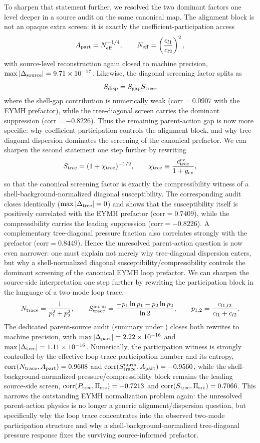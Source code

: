 \documentclass[aps,prd,onecolumn,notitlepage,nofootinbib,superscriptaddress,11pt,floatfix]{revtex4-2}
\begin{document}
To sharpen that statement further, we resolved the two dominant factors one level deeper in a source audit on the same canonical map. The alignment block is not an opaque extra screen: it is exactly the coefficient-participation access
\[
 A_{\rm part}=N_{\rm eff}^{-1/4},
\qquad
N_{\rm eff}=\left(\frac{c_{l1}}{c_{l2}}\right)^2,
\]
with source-level reconstruction again closed to machine precision, $\max|\Delta_{\rm source}|=9.71\times10^{-17}$. Likewise, the diagonal screening factor splits as
\[
S_{\rm disp}=S_{\rm gap}S_{\rm tree},
\]
where the shell-gap contribution is numerically weak ($\mathrm{corr}=0.0907$ with the EYMH prefactor), while the tree-diagonal screen carries the dominant suppression ($\mathrm{corr}=-0.8226$). Thus the remaining parent-action gap is now more specific: why coefficient participation controls the alignment block, and why tree-diagonal dispersion dominates the screening of the canonical prefactor.
We can sharpen the second statement one step further by rewriting
\[
S_{\rm tree}=(1+\chi_{\rm tree})^{-1/2},
\qquad
\chi_{\rm tree}\equiv \frac{c_{\rm tree}^{\rm cv}}{1+g_{\rm cv}},
\]
so that the canonical screening factor is exactly the compressibility witness of a shell-background-normalized diagonal susceptibility. The corresponding audit closes identically ($\max|\Delta_{\rm tree}|=0$) and shows that the susceptibility itself is positively correlated with the EYMH prefactor ($\mathrm{corr}=0.7409$), while the compressibility carries the leading suppression ($\mathrm{corr}=-0.8226$). A complementary tree-diagonal pressure fraction also correlates strongly with the prefactor ($\mathrm{corr}=0.8449$). Hence the unresolved parent-action question is now even narrower: one must explain not merely why tree-diagonal dispersion enters, but why a shell-normalized diagonal susceptibility/compressibility controls the dominant screening of the canonical EYMH loop prefactor.
We can sharpen the source-side interpretation one step further by rewriting the participation block in the language of a two-mode loop trace,
\[
N_{\rm trace}=\frac{1}{p_1^2+p_2^2},
\qquad
S_{\rm trace}^{\rm norm}=
\frac{-p_1\ln p_1-p_2\ln p_2}{\ln 2},
\qquad
p_{1,2}=\frac{c_{l1,l2}}{c_{l1}+c_{l2}}.
\]
The dedicated parent-source audit (summary under ) closes both rewrites to machine precision, with $\max|\Delta_{\rm part}|=2.22\times10^{-16}$ and $\max|\Delta_{\rm tree}|=1.11\times10^{-16}$. Numerically, the participation witness is strongly controlled by the effective loop-trace participation number and its entropy, $\mathrm{corr}(N_{\rm trace},A_{\rm part})=0.9608$ and $\mathrm{corr}(S_{\rm trace}^{\rm norm},A_{\rm part})=-0.9560$, while the shell-background-normalized pressure/compressibility block remains the leading source-side screen, $\mathrm{corr}(P_{\rm tree},\Pi_{\rm src})=-0.7213$ and $\mathrm{corr}(S_{\rm tree},\Pi_{\rm src})=0.7066$. This narrows the outstanding EYMH normalization problem again: the unresolved parent-action physics is no longer a generic alignment/dispersion question, but specifically why the loop trace concentrates into the observed two-mode participation structure and why a shell-background-normalized tree-diagonal pressure response fixes the surviving source-informed prefactor.
\end{document}
